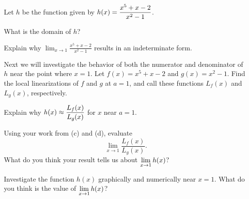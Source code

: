 \begin{pa} \label{PA:2.8}
Let $h$ be the function given by $\displaystyle h(x) = \frac{x^5 + x - 2}{x^2 - 1}$.
\ba
	\item What is the domain of $h$?
	\item Explain why $\displaystyle\lim_{x \to 1} \frac{x^5 + x
- 2}{x^2 - 1}$ results in an indeterminate form.
	\item Next we will investigate the behavior of both the numerator and denominator of $h$ near the point where $x = 1$.  Let $f(x) = x^5 + x - 2$
and $g(x) = x^2 - 1$. Find the local linearizations of $f$ and $g$ at $a = 1$, and call these functions $L_f(x)$ and $L_g(x)$, respectively.
	\item Explain why $\displaystyle h(x) \approx \frac{L_f(x)}{L_g(x)}$ for $x$ near $a = 1$.
	\item Using your work from (c) and (d), evaluate 
	$$\lim_{x \to 1} \frac{L_f(x)}{L_g(x)}.$$
	What do you think your result tells us about $\displaystyle \lim_{x \to 1} h(x)$?
	\item Investigate the function $h(x)$ graphically and numerically near $x = 1$.  What do you think is the value of $\displaystyle \lim_{x \to 1} h(x)$?
\ea
\end{pa} 
\afterpa